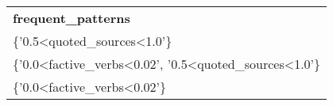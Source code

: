 \begin{tabular}{ll}
\multicolumn{2}{l}{\textbf{frequent\_patterns}}                                                                        \\
\multicolumn{2}{l}{\{'0.5\textless{}quoted\_sources\textless{}1.0'\}}                                                  \\
\multicolumn{2}{l}{\{'0.0\textless{}factive\_verbs\textless{}0.02',   '0.5\textless{}quoted\_sources\textless{}1.0'\}} \\
\multicolumn{2}{l}{\{'0.0\textless{}factive\_verbs\textless{}0.02'\}}                                                 
\end{tabular}